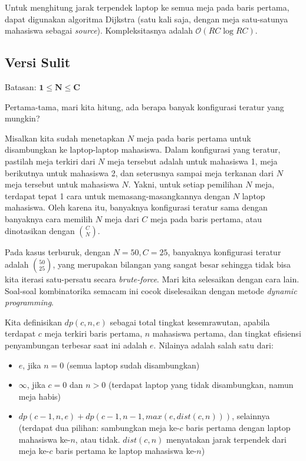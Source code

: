 \documentclass[../main_editorial.tex]{subfiles} %
\newcommand{\bigO}[1]{\mathcal{O}(#1)}
\begin{document}
Untuk menghitung jarak terpendek laptop ke semua meja pada baris pertama, dapat digunakan algoritma Dijkstra (satu kali saja, dengan meja satu-satunya mahasiswa sebagai \textit{source}). Kompleksitasnya adalah $ \bigO{RC \log RC} $.

\subsection*{Versi Sulit}

Batasan: $\mathbf{1 \le N \le C}$

Pertama-tama, mari kita hitung, ada berapa banyak konfigurasi teratur yang mungkin?

Misalkan kita sudah menetapkan $N$ meja pada baris pertama untuk disambungkan ke laptop-laptop mahasiswa. Dalam konfigurasi yang teratur, pastilah meja terkiri dari $N$ meja tersebut adalah untuk mahasiswa 1, meja berikutnya untuk mahasiswa 2, dan seterusnya sampai meja terkanan dari $N$ meja tersebut untuk mahasiswa $N$. Yakni, untuk setiap pemilihan $N$ meja, terdapat tepat 1 cara untuk memasang-masangkannya dengan $N$ laptop mahasiswa. Oleh karena itu, banyaknya konfigurasi teratur sama dengan banyaknya cara memilih $N$ meja dari $C$ meja pada baris pertama, atau dinotasikan dengan $\binom{C}{N}$.

Pada kasus terburuk, dengan $N = 50, C = 25$, banyaknya konfigurasi teratur adalah $\binom{50}{25}$, yang merupakan bilangan yang sangat besar sehingga tidak bisa kita iterasi satu-persatu secara \textit{brute-force}. Mari kita selesaikan dengan cara lain. Soal-soal kombinatorika semacam ini cocok diselesaikan dengan metode \textit{dynamic programming}.

Kita definisikan $dp(c, n, e)$ sebagai total tingkat kesemrawutan, apabila terdapat $c$ meja terkiri baris pertama, $n$ mahasiswa pertama, dan tingkat efisiensi penyambungan terbesar saat ini adalah $e$. Nilainya adalah salah satu dari:

\begin{itemize}
    \item $e$, jika  $n = 0$ (semua laptop sudah disambungkan)
    \item $\infty$, jika  $c = 0$ dan $n > 0$ (terdapat laptop yang tidak disambungkan, namun meja habis)
    \item $dp(c-1, n, e) + dp(c-1, n-1, max(e, dist(c, n)))$, selainnya (terdapat dua pilihan: sambungkan meja ke-$c$ baris pertama dengan laptop mahasiswa ke-$n$, atau tidak. $dist(c, n)$ menyatakan jarak terpendek dari meja ke-$c$ baris pertama ke laptop mahasiswa ke-$n$)
\end{itemize}
\end{document}
